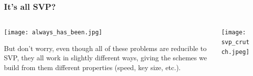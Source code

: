 \documentclass[
aspectratio=169, %
t, %
onlytextwidth, %
10pt, %
]{beamer}
\begin{document}

\begin{frame}
    \frametitle{It's all SVP?}

    \begin{columns}[T] %
        \begin{column}{0.58\linewidth} %
            \texttt{[image: always\_has\_been.jpg]} %

            \vspace{-1.5em}{\tiny\textcolor{ICLBlue}{(Above) Regev discovering the the LWE to $\gamma$-SVP reduction, 2005}}\newline

            \vspace{-2em}But don't worry, even though all of these problems are reducible to SVP, they all work in slightly different ways, giving the schemes we build from them different properties (speed, key size, etc.).
        \end{column}
        \begin{column}{0.38\linewidth} %
            \texttt{[image: svp\_crutch.jpeg]} %

            \vspace{-1.5em}{\tiny\textcolor{ICLBlue}{(Above) xkcd Dependency, lattice based cryptography special edition}}
        \end{column}
    \end{columns}
\end{frame}

\end{document}
